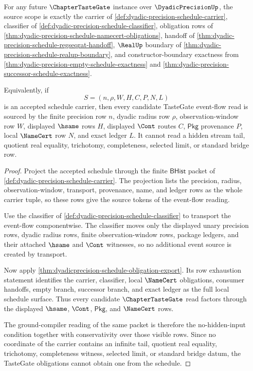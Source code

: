\begin{theorem}
\label{thm:dyadicprecision-tastegate-carrier-witness}
For any future $\ChapterTasteGate$ instance over $\DyadicPrecisionUp$, the
source scope is exactly the carrier of
\autoref{def:dyadic-precision-schedule-carrier}, classifier of
\autoref{def:dyadic-precision-schedule-classifier}, obligation rows of
\autoref{thm:dyadic-precision-schedule-namecert-obligations}, handoff of
\autoref{thm:dyadic-precision-schedule-regseqrat-handoff}, $\RealUp$ boundary
of \autoref{thm:dyadic-precision-schedule-realup-boundary}, and
constructor-boundary exactness from
\autoref{thm:dyadic-precision-empty-schedule-exactness} and
\autoref{thm:dyadic-precision-successor-schedule-exactness}.

Equivalently, if
$$
S=(n,\rho,W,H,C,P,N,L)
$$
is an accepted schedule carrier, then every candidate TasteGate event-flow read
is sourced by the finite precision row $n$, dyadic radius row $\rho$,
observation-window row $W$, displayed $\hsame$ rows $H$, displayed $\Cont$
routes $C$, $\mathsf{Pkg}$ provenance $P$, local $\NameCert$ row $N$, and exact
ledger $L$. It cannot read a hidden stream tail, quotient real equality,
trichotomy, completeness, selected limit, or standard bridge row.
\end{theorem}
\begin{proof}
Project the accepted schedule through the finite $\mathsf{BHist}$ packet of
\autoref{def:dyadic-precision-schedule-carrier}. The projection lists the
precision, radius, observation-window, transport, provenance, name, and ledger
rows as the whole carrier tuple, so these rows give the source tokens of the
event-flow reading.

Use the classifier of
\autoref{def:dyadic-precision-schedule-classifier} to transport the event-flow
componentwise. The classifier moves only the displayed unary precision rows,
dyadic radius rows, finite observation-window rows, package ledgers, and their
attached $\hsame$ and $\Cont$ witnesses, so no additional event source is
created by transport.

Now apply \autoref{thm:dyadicprecision-schedule-obligation-export}. Its row
exhaustion statement identifies the carrier, classifier, local
$\NameCert$ obligations, consumer handoffs, empty branch, successor branch, and
exact ledger as the full local schedule surface. Thus every candidate
$\ChapterTasteGate$ read factors through the displayed $\hsame$, $\Cont$,
$\mathsf{Pkg}$, and $\NameCert$ rows.

The ground-compiler reading of the same packet is therefore the no-hidden-input
condition together with conservativity over those visible rows. Since no
coordinate of the carrier contains an infinite tail, quotient real equality,
trichotomy, completeness witness, selected limit, or standard bridge datum, the
TasteGate obligations cannot obtain one from the schedule.
\end{proof}

